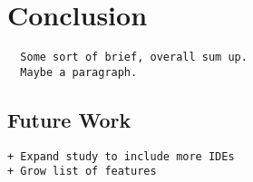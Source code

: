 \section{Conclusion}
\label{sec:conclusion}

\begin{verbatim}
  Some sort of brief, overall sum up.
  Maybe a paragraph.
\end{verbatim}

\subsection{Future Work}
\label{subsec:future_work}

\begin{verbatim}
+ Expand study to include more IDEs
+ Grow list of features
\end{verbatim}
